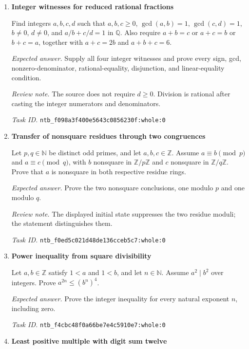 \documentclass[11pt]{article}
\newcommand{\pth}[1]{\nolinkurl{#1}}
\begin{document}
\begin{enumerate}[label={TEST \arabic*.},leftmargin=4.5em,itemsep=1em]
\emph{Expected answer.} Prove both cardinality equalities for the corresponding finite divisor sets.

\emph{Task ID.} \pth{ntb_e5f06a50a73ffcbedc223452:whole:0}

\item \textbf{Integer witnesses for reduced rational fractions}\label{qn:test:76}

Find integers $a,b,c,d$ such that $a,b,c\ge0$, $\gcd(a,b)=1$, $\gcd(c,d)=1$, $b\ne0$, $d\ne0$, and $a/b+c/d=1$ in $\mathbb Q$. Also require $a+b=c$ or $a+c=b$ or $b+c=a$, together with $a+c=2b$ and $a+b+c=6$.

\emph{Expected answer.} Supply all four integer witnesses and prove every sign, gcd, nonzero-denominator, rational-equality, disjunction, and linear-equality condition.

\emph{Review note.} The source does not require $d\ge0$. Division is rational after casting the integer numerators and denominators.

\emph{Task ID.} \pth{ntb_f098a3f400e5643c0856230f:whole:0}

\item \textbf{Transfer of nonsquare residues through two congruences}\label{qn:test:77}

Let $p,q\in\mathbb N$ be distinct odd primes, and let $a,b,c\in\mathbb Z$. Assume $a\equiv b\pmod p$ and $a\equiv c\pmod q$, with $b$ nonsquare in $\mathbb Z/p\mathbb Z$ and $c$ nonsquare in $\mathbb Z/q\mathbb Z$. Prove that $a$ is nonsquare in both respective residue rings.

\emph{Expected answer.} Prove the two nonsquare conclusions, one modulo $p$ and one modulo $q$.

\emph{Review note.} The displayed initial state suppresses the two residue moduli; the statement distinguishes them.

\emph{Task ID.} \pth{ntb_f0ed5c021d48de136cceb5c7:whole:0}

\item \textbf{Power inequality from square divisibility}\label{qn:test:78}

Let $a,b\in\mathbb Z$ satisfy $1<a$ and $1<b$, and let $n\in\mathbb N$. Assume $a^2\mid b^2$ over integers. Prove $a^{2n}\le(b^n)^4$.

\emph{Expected answer.} Prove the integer inequality for every natural exponent $n$, including zero.

\emph{Task ID.} \pth{ntb_f4cbc48f0a66be7e4c5910e7:whole:0}

\item \textbf{Least positive multiple with digit sum twelve}\label{qn:test:79}


\end{enumerate}
\end{document}
